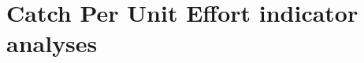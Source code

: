 \documentclass[12pt]{SCreport}
\begin{document}
%       
 \clearpage          

\section{Catch Per Unit Effort indicator analyses}




\clearpage
      
\end{document}
